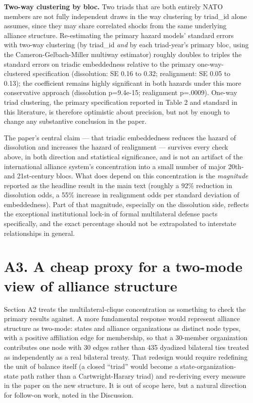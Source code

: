 \documentclass[Afour,sageh,times,doublespace]{sagej}
\begin{document}
\textbf{Two-way clustering by bloc.} Two triads that are both entirely NATO members are not fully independent draws in the way clustering by triad\_id alone assumes, since they may share correlated shocks from the same underlying alliance structure. Re-estimating the primary hazard models' standard errors with two-way clustering (by triad\_id \emph{and} by each triad-year's primary bloc, using the Cameron-Gelbach-Miller multiway estimator) roughly doubles to triples the standard errors on triadic embeddedness relative to the primary one-way-clustered specification (dissolution: SE 0.16 to 0.32; realignment: SE 0.05 to 0.13); the coefficient remains highly significant in both hazards under this more conservative approach (dissolution p=9.4e-15; realignment p=.0009). One-way triad clustering, the primary specification reported in Table 2 and standard in this literature, is therefore optimistic about precision, but not by enough to change any substantive conclusion in the paper.

The paper's central claim --- that triadic embeddedness reduces the hazard of dissolution and increases the hazard of realignment --- survives every check above, in both direction and statistical significance, and is not an artifact of the international alliance system's concentration into a small number of major 20th- and 21st-century blocs. What does depend on this concentration is the \emph{magnitude} reported as the headline result in the main text (roughly a 92\% reduction in dissolution odds, a 55\% increase in realignment odds per standard deviation of embeddedness). Part of that magnitude, especially on the dissolution side, reflects the exceptional institutional lock-in of formal multilateral defense pacts specifically, and the exact percentage should not be extrapolated to interstate relationships in general.

\section*{A3. A cheap proxy for a two-mode view of alliance structure}

Section A2 treats the multilateral-clique concentration as something to check the primary results against. A more fundamental response would represent alliance structure as two-mode: states and alliance organizations as distinct node types, with a positive affiliation edge for membership, so that a 30-member organization contributes one node with 30 edges rather than 435 dyadized bilateral ties treated as independently as a real bilateral treaty. That redesign would require redefining the unit of balance itself (a closed ``triad'' would become a state-organization-state path rather than a Cartwright-Harary triad) and re-deriving every measure in the paper on the new structure. It is out of scope here, but a natural direction for follow-on work, noted in the Discussion.
\end{document}
